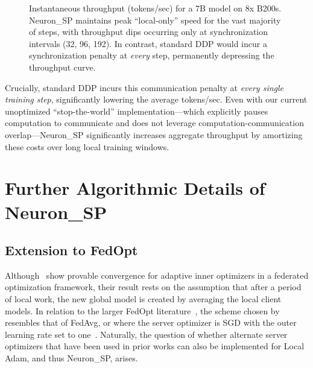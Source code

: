 \documentclass{article}
\begin{document}
\begin{figure}[t]
\centering
\caption{Instantaneous throughput (tokens/sec) for a 7B model on 8x B200s. Neuron\_SP maintains peak ``local-only'' speed for the vast majority of steps, with throughput dips occurring only at synchronization intervals (32, 96, 192). In contrast, standard DDP would incur a synchronization penalty at \textit{every} step, permanently depressing the throughput curve.}
\label{fig:throughput_7b}
\end{figure}

Crucially, standard DDP incurs this communication penalty at \textit{every single training step}, significantly lowering the average tokens/sec. Even with our current unoptimized ``stop-the-world'' implementation---which explicitly pauses computation to communicate and does not leverage computation-communication overlap---Neuron\_SP significantly increases aggregate throughput by amortizing these costs over long local training windows.

\begin{center}\end{center}

\section{Further Algorithmic Details of Neuron\_SP}
\label{sec:appendix_c}

\subsection{Extension to FedOpt}
\label{sec:fedopt}

Although~\citet{cheng2025convergence} show provable convergence for adaptive inner optimizers in a
federated optimization framework, their result rests on the assumption that after a period of local
work, the new global model is created by averaging the local client models. In relation to the larger
FedOpt literature~\citep{reddi2021adaptive}, the scheme chosen by~\citet{cheng2025convergence} resembles
that of FedAvg, or where the server optimizer is SGD with the outer learning rate set to one~\citep{reddi2021adaptive}.
Naturally, the question of whether alternate server optimizers that have been used in prior works
can also be implemented for Local Adam, and thus Neuron\_SP, arises.
\end{document}
